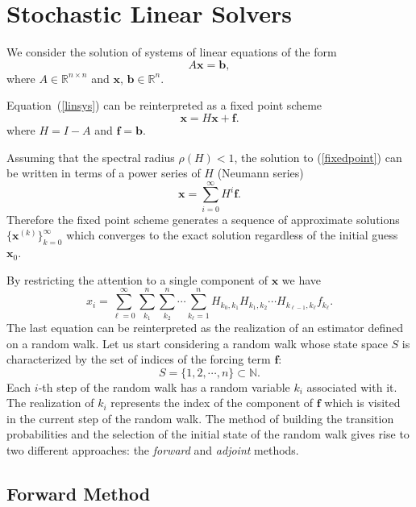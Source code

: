 \section{Stochastic Linear Solvers}
\label{sec:mcls}

We consider the solution of systems of linear equations of the form
\begin{equation}
A \mathbf{x}=\mathbf{b},
\label{linsys}
\end{equation}
where $A\in \mathbb{R}^{n\times n}$ and $\mathbf{x}$, $\mathbf{b} \in
\mathbb{R}^n$.

Equation~(\ref{linsys}) can be reinterpreted as a fixed point scheme
\begin{equation}
 \mathbf{x}=H\mathbf{x}+\mathbf{f}.
 \label{fixedpoint}
\end{equation}
where $H=I-A$ and $\mathbf{f}=\mathbf{b}$.

Assuming that the spectral radius $\rho(H)<1$, the solution to
(\ref{fixedpoint}) can be written in terms of a power series of
$H$ (Neumann series)
\[
\mathbf{x}=\sum_{i=0}^\infty H^i\mathbf{f}.
\]
Therefore the fixed point scheme generates a sequence of approximate solutions
$\{\mathbf{x}^{(k)}\}_{k=0}^{\infty}$ which converges to the exact solution
regardless of the initial guess $\mathbf{x}_0$.

By restricting the attention to a single component of $\mathbf{x}$ we
have
\begin{equation}
x_i=\sum_{\ell=0}^\infty \sum_{k_1}^n\sum_{k_2}^n\cdots \sum_{k_{\ell}=1}^n
H_{k_0,k_1}H_{k_1,k_2}\cdots H_{k_{\ell-1}, k_{\ell}}f_{k_{\ell}}.
\label{forward}
\end{equation}
The last equation can be reinterpreted as the realization of an estimator
defined on a random walk.  Let us start considering a random walk whose
state space $S$ is characterized by the set of indices of the forcing term
$\mathbf{f}$:
\[
S=\{1,2,\cdots, n\} \subset \mathbb{N}.
\]
Each $i$-th step of the random walk has a random variable
$k_i$ associated with it. The realization of $k_i$ represents the index of the
component of $\mathbf{f}$
which is visited in the current step of the random walk.
The method of building the transition probabilities and the selection of
the initial state of the random walk gives rise to two different approaches:
the \textit{forward} and \textit{adjoint} methods.

\subsection{Forward Method}
\label{subsec:forward}

